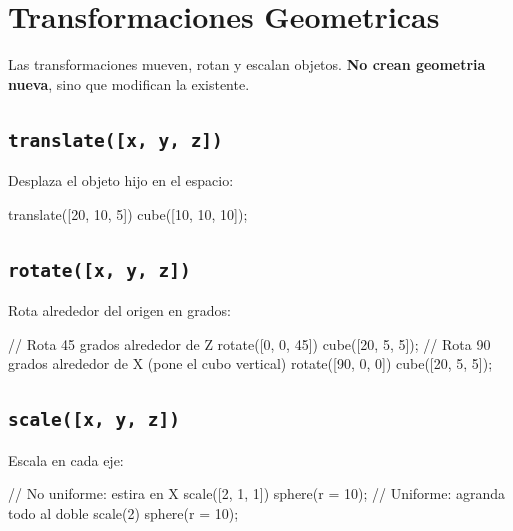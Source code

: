 \documentclass[12pt, oneside, a4paper]{report}
\newcommand{\codigo}[1]{\texttt{#1}}
\begin{document}

\chapter{Transformaciones Geometricas}

Las transformaciones mueven, rotan y escalan objetos. \textbf{No crean geometria nueva}, sino que modifican la existente.

\section{\codigo{translate([x, y, z])}}
Desplaza el objeto hijo en el espacio:
\begin{openscad}
translate([20, 10, 5])
    cube([10, 10, 10]);
\end{openscad}

\section{\codigo{rotate([x, y, z])}}
Rota alrededor del origen en grados:
\begin{openscad}
// Rota 45 grados alrededor de Z
rotate([0, 0, 45])
    cube([20, 5, 5]);
// Rota 90 grados alrededor de X (pone el cubo vertical)
rotate([90, 0, 0])
    cube([20, 5, 5]);
\end{openscad}

\section{\codigo{scale([x, y, z])}}
Escala en cada eje:
\begin{openscad}
// No uniforme: estira en X
scale([2, 1, 1]) sphere(r = 10);
// Uniforme: agranda todo al doble
scale(2) sphere(r = 10);
\end{openscad}
\end{document}

